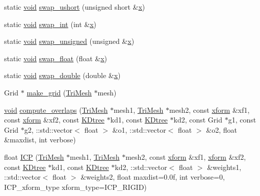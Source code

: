 \begin{DoxyCompactItemize}
\item 
static \hyperlink{namespacetrimesh_a784ddfd979e1c579bda795a8edfc3f43}{void} \hyperlink{namespacetrimesh_ae0af30870ab02a298324dd4b9caac2c8}{swap\+\_\+ushort} (unsigned short \&\hyperlink{namespacetrimesh_a3365d1b1a1bc5d8e9c844cf589a8c4a8}{x})
\item 
static \hyperlink{namespacetrimesh_a784ddfd979e1c579bda795a8edfc3f43}{void} \hyperlink{namespacetrimesh_a24751f8d6b73e77b797ae303cdfc5bee}{swap\+\_\+int} (int \&\hyperlink{namespacetrimesh_a3365d1b1a1bc5d8e9c844cf589a8c4a8}{x})
\item 
static \hyperlink{namespacetrimesh_a784ddfd979e1c579bda795a8edfc3f43}{void} \hyperlink{namespacetrimesh_a679a0ddf6b404c70457c5cc43814fe65}{swap\+\_\+unsigned} (unsigned \&\hyperlink{namespacetrimesh_a3365d1b1a1bc5d8e9c844cf589a8c4a8}{x})
\item 
static \hyperlink{namespacetrimesh_a784ddfd979e1c579bda795a8edfc3f43}{void} \hyperlink{namespacetrimesh_a58233e99696f056c2c5c581c7c2d3a5e}{swap\+\_\+float} (float \&\hyperlink{namespacetrimesh_a3365d1b1a1bc5d8e9c844cf589a8c4a8}{x})
\item 
static \hyperlink{namespacetrimesh_a784ddfd979e1c579bda795a8edfc3f43}{void} \hyperlink{namespacetrimesh_a8faa7aac5ffa5cc16f4512eef7dc2b65}{swap\+\_\+double} (double \&\hyperlink{namespacetrimesh_a3365d1b1a1bc5d8e9c844cf589a8c4a8}{x})
\item 
Grid $\ast$ \hyperlink{namespacetrimesh_ad6dfef32ed982206d691d6d94ad3190b}{make\+\_\+grid} (\hyperlink{classtrimesh_1_1TriMesh}{Tri\+Mesh} $\ast$mesh)
\item 
\hyperlink{namespacetrimesh_a784ddfd979e1c579bda795a8edfc3f43}{void} \hyperlink{namespacetrimesh_aa9254702bebad4e4f5fc958df4b30916}{compute\+\_\+overlaps} (\hyperlink{classtrimesh_1_1TriMesh}{Tri\+Mesh} $\ast$mesh1, \hyperlink{classtrimesh_1_1TriMesh}{Tri\+Mesh} $\ast$mesh2, const \hyperlink{namespacetrimesh_ad504958f2f56e393991b848986a8459f}{xform} \&xf1, const \hyperlink{namespacetrimesh_ad504958f2f56e393991b848986a8459f}{xform} \&xf2, const \hyperlink{classtrimesh_1_1KDtree}{K\+Dtree} $\ast$kd1, const \hyperlink{classtrimesh_1_1KDtree}{K\+Dtree} $\ast$kd2, const Grid $\ast$g1, const Grid $\ast$g2, \+::std\+::vector$<$ float $>$ \&o1, \+::std\+::vector$<$ float $>$ \&o2, float \&maxdist, int verbose)
\item 
float \hyperlink{namespacetrimesh_a0998a81f51d7ca84060748ea68c52e04}{I\+CP} (\hyperlink{classtrimesh_1_1TriMesh}{Tri\+Mesh} $\ast$mesh1, \hyperlink{classtrimesh_1_1TriMesh}{Tri\+Mesh} $\ast$mesh2, const \hyperlink{namespacetrimesh_ad504958f2f56e393991b848986a8459f}{xform} \&xf1, \hyperlink{namespacetrimesh_ad504958f2f56e393991b848986a8459f}{xform} \&xf2, const \hyperlink{classtrimesh_1_1KDtree}{K\+Dtree} $\ast$kd1, const \hyperlink{classtrimesh_1_1KDtree}{K\+Dtree} $\ast$kd2, \+::std\+::vector$<$ float $>$ \&weights1, \+::std\+::vector$<$ float $>$ \&weights2, float maxdist=0.\+0f, int verbose=0, I\+C\+P\+\_\+xform\+\_\+type xform\+\_\+type=\+I\+C\+P\+\_\+\+R\+I\+G\+I\+D)

\end{DoxyCompactItemize}
